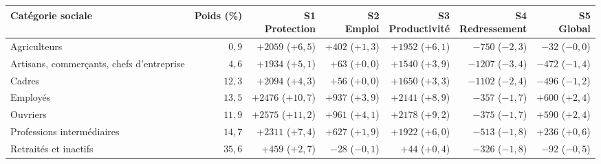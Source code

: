 \begin{tabular}{p{4.2cm}rrrrrr}\toprule Catégorie sociale & Poids (\%) & \makecell{S1\\Protection} & \makecell{S2\\Emploi} & \makecell{S3\\Productivité} & \makecell{S4\\Redressement} & \makecell{S5\\Global}\\ \midrule
Agriculteurs & $0{,}9$ & $+2059$ ($+6{,}5$) & $+402$ ($+1{,}3$) & $+1952$ ($+6{,}1$) & $-750$ ($-2{,}3$) & $-32$ ($-0{,}0$)\\
Artisans, commerçants, chefs d'entreprise & $4{,}6$ & $+1934$ ($+5{,}1$) & $+63$ ($+0{,}0$) & $+1540$ ($+3{,}9$) & $-1207$ ($-3{,}4$) & $-472$ ($-1{,}4$)\\
Cadres & $12{,}3$ & $+2094$ ($+4{,}3$) & $+56$ ($+0{,}0$) & $+1650$ ($+3{,}3$) & $-1102$ ($-2{,}4$) & $-496$ ($-1{,}2$)\\
Employés & $13{,}5$ & $+2476$ ($+10{,}7$) & $+937$ ($+3{,}9$) & $+2141$ ($+8{,}9$) & $-357$ ($-1{,}7$) & $+600$ ($+2{,}4$)\\
Ouvriers & $11{,}9$ & $+2575$ ($+11{,}2$) & $+961$ ($+4{,}1$) & $+2178$ ($+9{,}2$) & $-375$ ($-1{,}7$) & $+590$ ($+2{,}4$)\\
Professions intermédiaires & $14{,}7$ & $+2311$ ($+7{,}4$) & $+627$ ($+1{,}9$) & $+1922$ ($+6{,}0$) & $-513$ ($-1{,}8$) & $+236$ ($+0{,}6$)\\
Retraités et inactifs & $35{,}6$ & $+459$ ($+2{,}7$) & $-28$ ($-0{,}1$) & $+44$ ($+0{,}4$) & $-326$ ($-1{,}8$) & $-92$ ($-0{,}5$)\\\bottomrule\end{tabular}